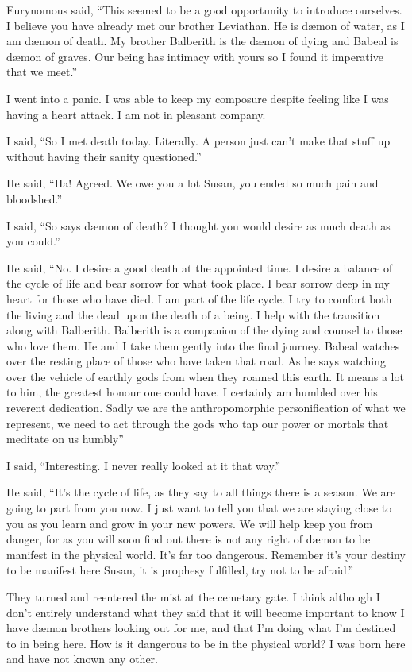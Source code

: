 Eurynomous said, ``This seemed to be a good opportunity to introduce ourselves. I believe you have already met our brother Leviathan. He is d\ae mon of water, as I am d\ae mon of death. My brother Balberith is the d\ae mon of dying and Babeal is d\ae mon of graves. Our being has intimacy with yours so I found it imperative that we meet.''

I went into a panic. I was able to keep my composure despite feeling like I was having a heart attack. I am not in pleasant company.

I said, ``So I met death today. Literally. A person just can't make that stuff up without having their sanity questioned.''

He said, ``Ha! Agreed. We owe you a lot Susan, you ended so much pain and bloodshed.''

I said, ``So says d\ae mon of death? I thought you would desire as much death as you could.''

He said, ``No. I desire a good death at the appointed time. I desire a balance of the cycle of life and bear sorrow for what took place. I bear sorrow deep in my heart for those who have died. I am part of the life cycle. I try to comfort both the living and the dead upon the death of a being. I help with the transition along with Balberith. Balberith is a companion of the dying and counsel to those who love them. He and I take them gently into the final journey. Babeal watches over the resting place of those who have taken that road. As he says watching over the vehicle of earthly gods from when they roamed this earth. It means a lot to him, the greatest honour one could have. I certainly am humbled over his reverent dedication. Sadly we are the anthropomorphic personification of what we represent, we need to act through the gods who tap our power or mortals that meditate on us humbly''

I said, ``Interesting. I never really looked at it that way.''

He said, ``It's the cycle of life, as they say to all things there is a season. We are going to part from you now. I just want to tell you that we are staying close to you as you learn and grow in your new powers. We will help keep you from danger, for as you will soon find out there is not any right of d\ae mon to be manifest in the physical world. It's far too dangerous. Remember it's your destiny to be manifest here Susan, it is prophesy fulfilled, try not to be afraid.''

They turned and reentered the mist at the cemetary gate. I think although I don't entirely understand what they said that it will become important to know I have d\ae mon brothers looking out for me, and that I'm doing what I'm destined to in being here. How is it dangerous to be in the physical world? I was born here and have not known any other.

